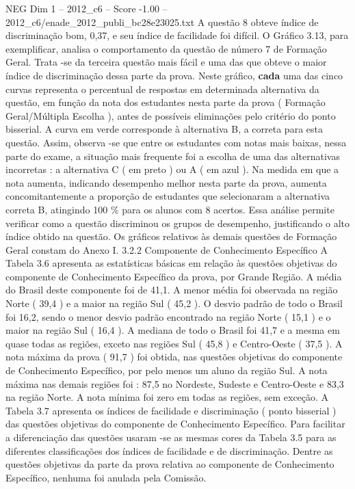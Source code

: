\begin{textsample}{NEG Dim 1 – 2012\_c6 – Score -1.00 – 2012\_c6/enade\_2012\_publi\_bc28e23025.txt}
A questão 8 obteve índice de discriminação bom, 0,37, e seu índice de facilidade foi difícil.
O Gráfico 3.13, para exemplificar, analisa o comportamento da questão de número 7 de Formação Geral.
Trata -se da terceira questão mais fácil e uma das que obteve o maior índice de discriminação dessa parte da prova.
Neste gráfico, \textbf{cada} uma das cinco curvas representa o percentual de respostas em determinada alternativa da questão, em função da nota dos estudantes nesta parte da prova ( Formação Geral/Múltipla Escolha ), antes de possíveis eliminações pelo critério do ponto bisserial.
A curva em verde corresponde à alternativa B, a correta para esta questão.
Assim, observa -se que entre os estudantes com notas mais baixas, nessa parte do exame, a situação mais frequente foi a escolha de uma das alternativas incorretas : a alternativa C ( em preto ) ou A ( em azul ).
Na medida em que a nota aumenta, indicando desempenho melhor nesta parte da prova, aumenta concomitantemente a proporção de estudantes que selecionaram a alternativa correta B, atingindo 100 \% para os alunos com 8 acertos.
Essa análise permite verificar como a questão discriminou os grupos de desempenho, justificando o alto índice obtido na questão.
Os gráficos relativos às demais questões de Formação Geral constam do Anexo I. 3.2.2 Componente de Conhecimento Específico A Tabela 3.6 apresenta as estatísticas básicas em relação às questões objetivas do componente de Conhecimento Específico da prova, por Grande Região.
A média do Brasil deste componente foi de 41,1.
A menor média foi observada na região Norte ( 39,4 ) e a maior na região Sul ( 45,2 ).
O desvio padrão de todo o Brasil foi 16,2, sendo o menor desvio padrão encontrado na região Norte ( 15,1 ) e o maior na região Sul ( 16,4 ).
A mediana de todo o Brasil foi 41,7 e a mesma em quase todas as regiões, exceto nas regiões Sul ( 45,8 ) e Centro-Oeste ( 37,5 ).
A nota máxima da prova ( 91,7 ) foi obtida, nas questões objetivas do componente de Conhecimento Específico, por pelo menos um aluno da região Sul.
A nota máxima nas demais regiões foi : 87,5 no Nordeste, Sudeste e Centro-Oeste e 83,3 na região Norte.
A nota mínima foi zero em todas as regiões, sem exceção.
A Tabela 3.7 apresenta os índices de facilidade e discriminação ( ponto bisserial ) das questões objetivas do componente de Conhecimento Específico.
Para facilitar a diferenciação das questões usaram -se as mesmas cores da Tabela 3.5 para as diferentes classificações dos índices de facilidade e de discriminação.
Dentre as questões objetivas da parte da prova relativa ao componente de Conhecimento Específico, nenhuma foi anulada pela Comissão.

\end{textsample}
